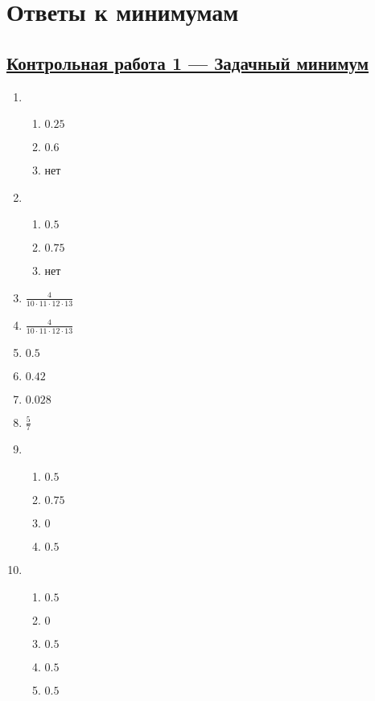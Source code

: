 \thispagestyle{empty}
\section{Ответы к минимумам}

\subsection[Кр 1]{\hyperref[sec:minimum_kr_01]{Контрольная работа 1 — Задачный минимум}}
\label{sec:sol_minimum_kr_01}



\begin{multicols}{2}
\begin{enumerate}
	\item
			\begin{enumerate}
				\item $0.25$
				\item $0.6$
				\item нет
			\end{enumerate}
	\item
			\begin{enumerate}
				\item $0.5$
				\item $0.75$
				\item нет
			\end{enumerate}
	\item $\frac{4}{10 \cdot 11 \cdot 12 \cdot 13}$
	\item $\frac{4}{10 \cdot 11 \cdot 12 \cdot 13}$
	\item $0.5$
	\item $0.42$
	\item $0.028$
	\item $\frac{5}{7}$
	\item
			\begin{enumerate}
				\item $0.5$
				\item $0.75$
				\item $0$
				\item $0.5$
			\end{enumerate}
	\item
			\begin{enumerate}
				\item $0.5$
				\item $0$
				\item $0.5$
				\item $0.5$
				\item $0.5$
			\end{enumerate}

\end{enumerate}
\end{multicols}
